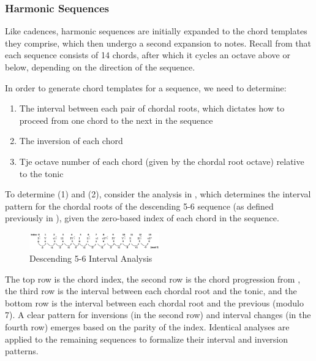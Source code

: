 \documentclass{article}
\begin{document}
\subsubsection{Harmonic Sequences}
Like cadences, harmonic sequences are initially expanded to the chord templates they comprise, which then undergo a second expansion to notes. Recall from  that each sequence consists of 14 chords, after which it cycles an octave above or below, depending on the direction of the sequence.

In order to generate chord templates for a sequence, we need to determine:

\vspace{-1mm}
\begin{enumerate}
\itemsep0em 
\item The interval between each pair of chordal roots, which dictates how to proceed from one chord to the next in the sequence
\item The inversion of each chord
\item Tje octave number of each chord (given by the chordal root octave) relative to the tonic
\end{enumerate}


To determine (1) and (2), consider the analysis in , which determines the interval pattern for the chordal roots of the descending 5-6 sequence (as defined previously in ), given the zero-based index of each chord in the sequence.

\begin{figure}[h!]
\centering
\includegraphics[width=0.5\textwidth]{images/desc_56_intervals}
  \caption{Descending 5-6 Interval Analysis}\label{fig:desc_56_intervals}
\end{figure}
\vspace{-3mm}

The top row is the chord index, the second row is the chord progression from , the third row is the interval between each chordal root and the tonic, and the bottom row is the interval between each chordal root and the previous (modulo 7). A clear pattern for inversions (in the second row) and interval changes (in the fourth row) emerges based on the parity of the index. Identical analyses are applied to the remaining sequences to formalize their interval and inversion patterns.
\end{document}
